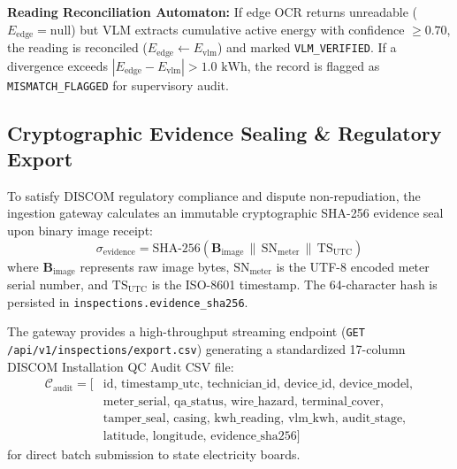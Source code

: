 \documentclass[conference]{IEEEtran}
\begin{document}
\textbf{Reading Reconciliation Automaton:} If edge OCR returns unreadable ($E_{\text{edge}} = \text{null}$) but VLM extracts cumulative active energy with confidence $\ge 0.70$, the reading is reconciled ($E_{\text{edge}} \gets E_{\text{vlm}}$) and marked \texttt{VLM\_VERIFIED}. If a divergence exceeds $|E_{\text{edge}} - E_{\text{vlm}}| > 1.0\text{~kWh}$, the record is flagged as \texttt{MISMATCH\_FLAGGED} for supervisory audit.

\subsection{Cryptographic Evidence Sealing \& Regulatory Export}
To satisfy DISCOM regulatory compliance and dispute non-repudiation, the ingestion gateway calculates an immutable cryptographic SHA-256 evidence seal upon binary image receipt:
\begin{equation}
\sigma_{\text{evidence}} = \text{SHA-256}\left( \mathbf{B}_{\text{image}} \,\|\, \text{SN}_{\text{meter}} \,\|\, \text{TS}_{\text{UTC}} \right)
\label{eq:evidence_seal}
\end{equation}
where $\mathbf{B}_{\text{image}}$ represents raw image bytes, $\text{SN}_{\text{meter}}$ is the UTF-8 encoded meter serial number, and $\text{TS}_{\text{UTC}}$ is the ISO-8601 timestamp. The 64-character hash is persisted in \texttt{inspections.evidence\_sha256}.

The gateway provides a high-throughput streaming endpoint (\texttt{GET /api/v1/inspections/export.csv}) generating a standardized 17-column DISCOM Installation QC Audit CSV file:
\begin{align}
\mathcal{C}_{\text{audit}} = \big[ &\text{id}, \, \text{timestamp\_utc}, \, \text{technician\_id}, \, \text{device\_id}, \, \text{device\_model}, \nonumber \\
&\text{meter\_serial}, \, \text{qa\_status}, \, \text{wire\_hazard}, \, \text{terminal\_cover}, \nonumber \\
&\text{tamper\_seal}, \, \text{casing}, \, \text{kwh\_reading}, \, \text{vlm\_kwh}, \, \text{audit\_stage}, \nonumber \\
&\text{latitude}, \, \text{longitude}, \, \text{evidence\_sha256} \big]
\label{eq:csv_export}
\end{align}
for direct batch submission to state electricity boards.
\end{document}
